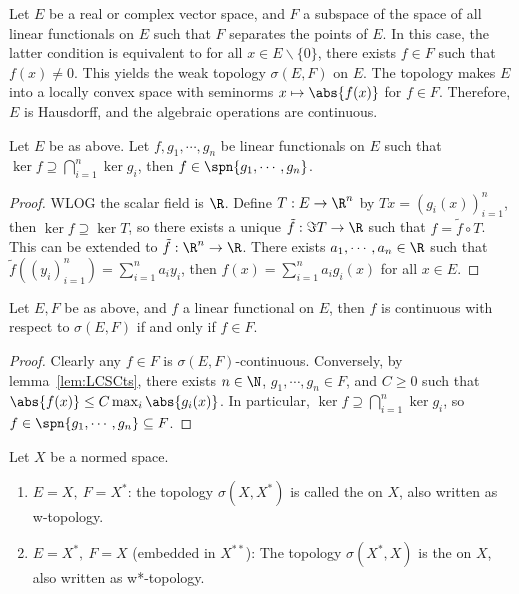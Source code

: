 \documentclass[a4paper]{article}
\begin{document}
Let $E$ be a real or complex vector space, and $F$ a subspace of the space of all linear functionals on $E$ such that $F$ separates the points of $E$. In this case, the latter condition is equivalent to for all $x\in E\backslash\{0\}$, there exists $f\in F$ such that $f(x)\not= 0$. This yields the weak topology $\sigma(E,F)$ on $E$. The topology makes $E$ into a locally convex space with seminorms $x\mapsto\abs{f(x)}$ for $f\in F$. Therefore, $E$ is Hausdorff, and the algebraic operations are continuous.

\begin{nlemma}\label{lem:LinearAlgebra}
  Let $E$ be as above. Let $f,g_1,\cdots,g_n$ be linear functionals on $E$ such that $\ker f\supseteq\bigcap_{i=1}^n\ker g_i$, then $f\in\spn\{g_1,\cdots, g_n\}$.
\end{nlemma}

\begin{proof}
  WLOG the scalar field is $\R$. Define $T:E\to\R^n$ by $Tx=(g_i(x))_{i=1}^n$, then $\ker f\supseteq\ker T$, so there exists a unique $\tilde{f}:\Im T\to\R$ such that $f=\tilde{f}\circ T$. This can be extended to $\tilde{f}:\R^n\to\R$. There exists $a_1,\cdots,a_n\in\R$ such that $\tilde{f}((y_i)_{i=1}^n)=\sum_{i=1}^n a_iy_i$, then $f(x)=\sum_{i=1}^n a_i g_i(x)$ for all $x\in E$.
\end{proof}

\begin{nprop}\label{prop:WeakContinuousFunctional}
  Let $E,F$ be as above, and $f$ a linear functional on $E$, then $f$ is continuous with respect to $\sigma(E,F)$ if and only if $f\in F$.
\end{nprop}

\begin{proof}
  Clearly any $f\in F$ is $\sigma(E,F)$-continuous. Conversely, by lemma~\ref{lem:LCSCts}, there exists $n\in\N$, $g_1,\cdots,g_n\in F$, and $C\geq 0$ such that $\abs{f(x)}\leq C\max_i\abs{g_i(x)}$. In particular, $\ker f\supseteq\bigcap_{i=1}^n\ker g_i$, so $f\in\spn\{g_1,\cdots,g_n\}\subseteq F$.
\end{proof}

\begin{eg}
Let $X$ be a normed space.
	\begin{enumerate}[label=(\arabic*)]
		\item $E=X,\ F=X^*$: the topology $\sigma(X,X^*)$ is called the  on $X$, also written as w-topology.
		\item $E=X^*,\ F=X$ (embedded in $X^{**}$): The topology $\sigma(X^*,X)$ is the  on $X$, also written as w*-topology.
	\end{enumerate}
\end{eg}
\end{document}
